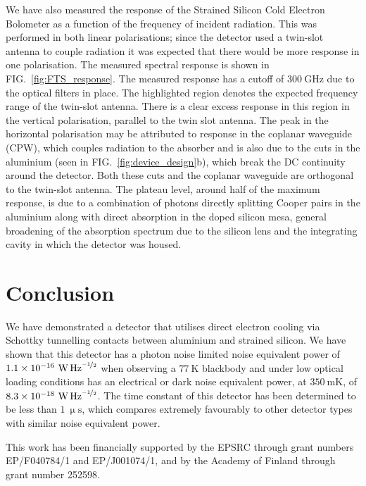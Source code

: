 \documentclass[aip, apl, a4paper, amsmath,amssymb, reprint]{revtex4-1}
\begin{document}
We have also measured the response of the Strained Silicon Cold Electron Bolometer as a function of the frequency of incident radiation. This was performed in both linear polarisations; since the detector used a twin-slot antenna to couple radiation it was expected that there would be more response in one polarisation. The measured spectral response is shown in FIG.~\ref{fig:FTS_response}. The measured response has a cutoff of $300~\mathrm{GHz}$ due to the optical filters in place. The highlighted region denotes the expected frequency range of the twin-slot antenna. There is a clear excess response in this region in the vertical polarisation, parallel to the twin slot antenna. The peak in the horizontal polarisation may be attributed to response in the coplanar waveguide (CPW), which couples radiation to the absorber and is also due to the cuts in the aluminium (seen in FIG.~\ref{fig:device_design}b), which break the DC continuity around the detector. Both these cuts and the coplanar waveguide are orthogonal to the twin-slot antenna. The plateau level, around half of the maximum response, is due to a combination of photons directly splitting Cooper pairs in the aluminium along with direct absorption in the doped silicon mesa, general broadening of the absorption spectrum due to the silicon lens and the integrating cavity in which the detector was housed.

\section{Conclusion}\label{sec:conclusion}
We have demonstrated a detector that utilises direct electron cooling via Schottky tunnelling contacts between aluminium and strained silicon. We have shown that this detector has a photon noise limited noise equivalent power of $1.1 \times 10^{-16}~\mathrm{\mbox{W\,Hz}^{\nicefrac{-1}{2}}}$ when observing a  $77~\mathrm{K}$ blackbody and under low optical loading conditions has an electrical or dark noise equivalent power, at $350~\mathrm{mK}$, of $8.3 \times 10^{-18}~\mathrm{\mbox{W\,Hz}^{\nicefrac{-1}{2}}}$. The time constant of this detector has been determined to be less than $1~\mathrm{\upmu s}$, which compares extremely favourably to other detector types with similar noise equivalent power.

This work has been financially supported by the EPSRC through grant numbers EP/F040784/1 and EP/J001074/1, and by the Academy of Finland through grant number 252598.

\end{document}
